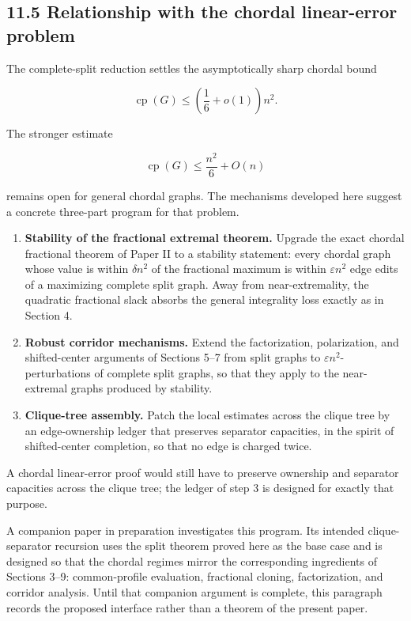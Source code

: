 \documentclass[
  11pt,
]{article}
\begin{document}
\subsection{11.5 Relationship with the chordal linear-error
problem}\label{relationship-with-the-chordal-linear-error-problem}

The complete-split reduction settles the asymptotically sharp chordal
bound

\[
\operatorname{cp}(G)
\le
\left(\frac16+o(1)\right)n^2.
\]

The stronger estimate

\[
\operatorname{cp}(G)
\le
\frac{n^2}{6}+O(n)
\]

remains open for general chordal graphs. The mechanisms developed here
suggest a concrete three-part program for that problem.

\begin{enumerate}
\def\labelenumi{\arabic{enumi}.}
\item
  \textbf{Stability of the fractional extremal theorem.} Upgrade the
  exact chordal fractional theorem of Paper II to a stability statement:
  every chordal graph whose value is within \(\delta n^2\) of the
  fractional maximum is within \(\varepsilon n^2\) edge edits of a
  maximizing complete split graph. Away from near-extremality, the
  quadratic fractional slack absorbs the general integrality loss
  exactly as in Section 4.
\item
  \textbf{Robust corridor mechanisms.} Extend the factorization,
  polarization, and shifted-center arguments of Sections 5--7 from split
  graphs to \(\varepsilon n^2\)-perturbations of complete split graphs,
  so that they apply to the near-extremal graphs produced by stability.
\item
  \textbf{Clique-tree assembly.} Patch the local estimates across the
  clique tree by an edge-ownership ledger that preserves separator
  capacities, in the spirit of shifted-center completion, so that no
  edge is charged twice.
\end{enumerate}

A chordal linear-error proof would still have to preserve ownership and
separator capacities across the clique tree; the ledger of step 3 is
designed for exactly that purpose.

A companion paper in preparation investigates this program. Its intended
clique-separator recursion uses the split theorem proved here as the
base case and is designed so that the chordal regimes mirror the
corresponding ingredients of Sections 3--9: common-profile evaluation,
fractional cloning, factorization, and corridor analysis. Until that
companion argument is complete, this paragraph records the proposed
interface rather than a theorem of the present paper.
\end{document}
